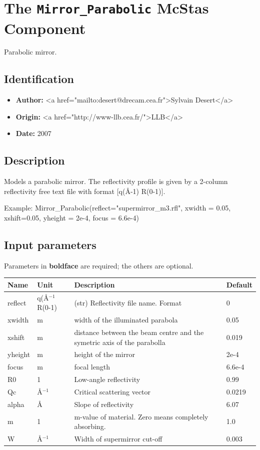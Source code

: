 \section{The \texttt{Mirror\_Parabolic} McStas Component}
Parabolic mirror.

\subsection*{Identification}
\begin{itemize}
  \item \textbf{Author:} \textless{}a href="mailto:desert@drecam.cea.fr"\textgreater{}Sylvain Desert\textless{}/a\textgreater{}
  \item \textbf{Origin:} \textless{}a href="http://www-llb.cea.fr/"\textgreater{}LLB\textless{}/a\textgreater{}
  \item \textbf{Date:} 2007
\end{itemize}

\subsection*{Description}
Models a parabolic mirror. The reflectivity profile is given by a 2-column reflectivity free text file with format [q(\AA{}-1) R(0-1)].

Example: Mirror\_Parabolic(reflect="supermirror\_m3.rfl", xwidth = 0.05, xshift=0.05, yheight = 2e-4, focus = 6.6e-4)

\subsection*{Input parameters}
Parameters in \textbf{boldface} are required; the others are optional.

\begin{longtable}{p{}p{}p{}p{}}
\toprule
\textbf{Name} & \textbf{Unit} & \textbf{Description} & \textbf{Default} \\
\midrule
\endhead
reflect & q(\AA{}$^{-1}$ R(0-1) & (str) Reflectivity file name. Format & 0 \\
xwidth & m & width of the illuminated parabola & 0.05 \\
xshift & m & distance between the beam centre and the symetric axis of the parabolla & 0.019 \\
yheight & m & height of the mirror & 2e-4 \\
focus & m & focal length & 6.6e-4 \\
R0 & 1 & Low-angle reflectivity & 0.99 \\
Qc & \AA{}$^{-1}$ & Critical scattering vector & 0.0219 \\
alpha & \AA{} & Slope of reflectivity & 6.07 \\
m & 1 & m-value of material. Zero means completely absorbing. & 1.0 \\
W & \AA{}$^{-1}$ & Width of supermirror cut-off & 0.003 \\
\bottomrule
\end{longtable}

